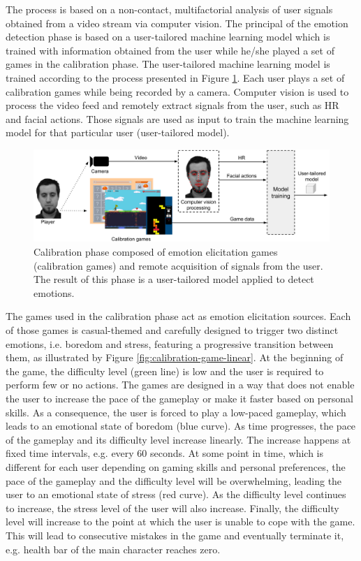 The process is based on a non-contact, multifactorial analysis of user signals obtained from a video stream via computer vision. The principal of the emotion detection phase is based on a user-tailored machine learning model which is trained with information obtained from the user while he/she played a set of games in the calibration phase. The user-tailored machine learning model is trained according to the process presented in Figure \ref{fig:user-tailored-calibration}. Each user plays a set of calibration games while being recorded by a camera. Computer vision is used to process the video feed and remotely extract signals from the user, such as HR and facial actions. Those signals are used as input to train the machine learning model for that particular user (user-tailored model).

\begin{figure}[h]
    \centering
    \includegraphics[width=\textwidth]{Content/figures/user-tailored-calibration}
    \caption{Calibration phase composed of emotion elicitation games (calibration games) and remote acquisition of signals from the user. The result of this phase is a user-tailored model applied to detect emotions.}
    \label{fig:user-tailored-calibration}
\end{figure}

The games used in the calibration phase act as emotion elicitation sources. Each of those games is casual-themed and carefully designed to trigger two distinct emotions, i.e. boredom and stress, featuring a progressive transition between them, as illustrated by Figure \ref{fig:calibration-game-linear}. At the beginning of the game, the difficulty level (green line) is low and the user is required to perform few or no actions. The games are designed in a way that does not enable the user to increase the pace of the gameplay or make it faster based on personal skills. As a consequence, the user is forced to play a low-paced gameplay, which leads to an emotional state of boredom (blue curve). As time progresses, the pace of the gameplay and its difficulty level increase linearly. The increase happens at fixed time intervals, e.g. every 60 seconds. At some point in time, which is different for each user depending on gaming skills and personal preferences, the pace of the gameplay and the difficulty level will be overwhelming, leading the user to an emotional state of stress (red curve). As the difficulty level continues to increase, the stress level of the user will also increase. Finally, the difficulty level will increase to the point at which the user is unable to cope with the game. This will lead to consecutive mistakes in the game and eventually terminate it, e.g. health bar of the main character reaches zero.

